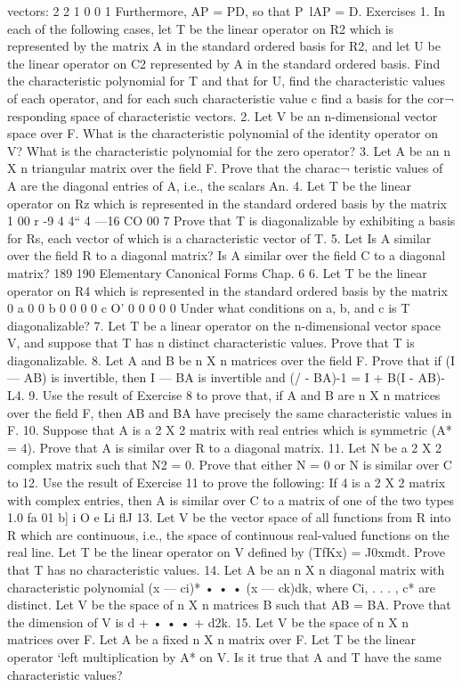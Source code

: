 vectors: 2 2 1 0 0 1 Furthermore, AP = PD, so that P~lAP = D. Exercises 1. In each of the following cases, let T be the linear operator on R2 which is represented by the matrix A in the standard ordered basis for R2, and let U be the linear operator on C2 represented by A in the standard ordered basis. Find the characteristic polynomial for T and that for U, find the characteristic values of each operator, and for each such characteristic value c find a basis for the cor¬ responding space of characteristic vectors. 2. Let V be an n-dimensional vector space over F. What is the characteristic polynomial of the identity operator on V? What is the characteristic polynomial for the zero operator? 3. Let A be an n X n triangular matrix over the field F. Prove that the charac¬ teristic values of A are the diagonal entries of A, i.e., the scalars An. 4. Let T be the linear operator on Rz which is represented in the standard ordered basis by the matrix 1 00 r -9 4 4“ 4  —16 CO 00 7 Prove that T is diagonalizable by exhibiting a basis for Rs, each vector of which is a characteristic vector of T. 5. Let Is A similar over the field R to a diagonal matrix? Is A similar over the field C to a diagonal matrix? 189 190 Elementary Canonical Forms Chap. 6 6. Let T be the linear operator on R4 which is represented in the standard ordered basis by the matrix 0 a 0 0 b 0 0 0 0 c O' 0 0 0 0 0 Under what conditions on a, b, and c is T diagonalizable? 7. Let T be a linear operator on the n-dimensional vector space V, and suppose that T has n distinct characteristic values. Prove that T is diagonalizable. 8. Let A and B be n X n matrices over the field F. Prove that if (I — AB) is invertible, then I — BA is invertible and (/ - BA)-1 = I + B(I - AB)-L4. 9. Use the result of Exercise 8 to prove that, if A and B are n X n matrices over the field F, then AB and BA have precisely the same characteristic values in F. 10. Suppose that A is a 2 X 2 matrix with real entries which is symmetric (A* = 4). Prove that A is similar over R to a diagonal matrix. 11. Let N be a 2 X 2 complex matrix such that N2 = 0. Prove that either N = 0 or N is similar over C to 12. Use the result of Exercise 11 to prove the following: If 4 is a 2 X 2 matrix with complex entries, then A is similar over C to a matrix of one of the two types 1.0 fa 01 b] i O e Li flJ 13. Let V be the vector space of all functions from R into R which are continuous, i.e., the space of continuous real-valued functions on the real line. Let T be the linear operator on V defined by (TfKx) = J0xmdt. Prove that T has no characteristic values. 14. Let A be an n X n diagonal matrix with characteristic polynomial (x — ci)* • • • (x — ck)dk, where Ci, . . . , c* are distinct. Let V be the space of n X n matrices B such that AB = BA. Prove that the dimension of V is d + • • • + d2k. 15. Let V be the space of n X n matrices over F. Let A be a fixed n X n matrix over F. Let T be the linear operator ‘left multiplication by A* on V. Is it true that A and T have the same characteristic values?
